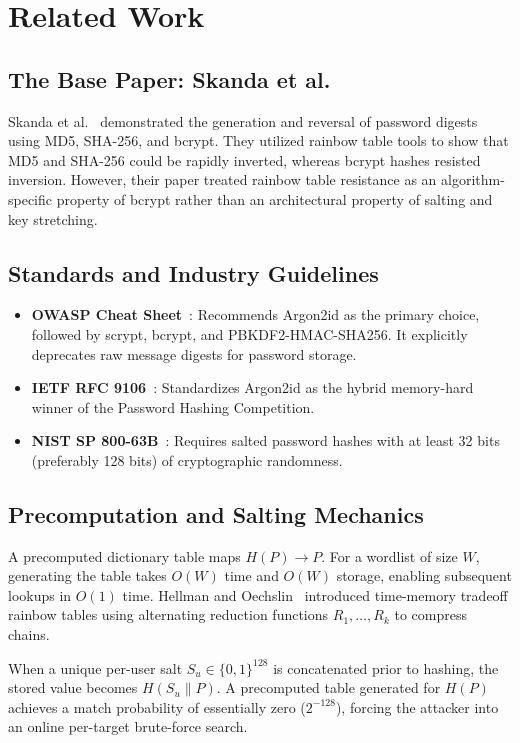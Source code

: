 \documentclass[conference]{IEEEtran}
\begin{document}
\section{Related Work}
\subsection{The Base Paper: Skanda et al.}
Skanda et al.~\cite{skanda2022} demonstrated the generation and reversal of password digests using MD5, SHA-256, and bcrypt. They utilized rainbow table tools to show that MD5 and SHA-256 could be rapidly inverted, whereas bcrypt hashes resisted inversion. However, their paper treated rainbow table resistance as an algorithm-specific property of bcrypt rather than an architectural property of salting and key stretching.

\subsection{Standards and Industry Guidelines}
\begin{itemize}
    \item \textbf{OWASP Cheat Sheet}~\cite{owasp}: Recommends Argon2id as the primary choice, followed by scrypt, bcrypt, and PBKDF2-HMAC-SHA256. It explicitly deprecates raw message digests for password storage.
    \item \textbf{IETF RFC 9106}~\cite{rfc9106}: Standardizes Argon2id as the hybrid memory-hard winner of the Password Hashing Competition.
    \item \textbf{NIST SP 800-63B}~\cite{nist}: Requires salted password hashes with at least 32 bits (preferably 128 bits) of cryptographic randomness.
\end{itemize}

\subsection{Precomputation and Salting Mechanics}
A precomputed dictionary table maps $H(P) \to P$. For a wordlist of size $W$, generating the table takes $O(W)$ time and $O(W)$ storage, enabling subsequent lookups in $O(1)$ time. Hellman and Oechslin~\cite{oechslin2003} introduced time-memory tradeoff rainbow tables using alternating reduction functions $R_1, \dots, R_k$ to compress chains. 

When a unique per-user salt $S_u \in \{0, 1\}^{128}$ is concatenated prior to hashing, the stored value becomes $H(S_u \parallel P)$. A precomputed table generated for $H(P)$ achieves a match probability of essentially zero ($2^{-128}$), forcing the attacker into an online per-target brute-force search.
\end{document}
